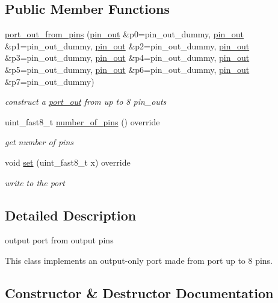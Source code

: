 \subsection*{Public Member Functions}
\begin{DoxyCompactItemize}
\item 
\hyperlink{classhwlib_1_1port__out__from__pins_af72ebaf01a3b43493d0cd60da2f66420}{port\+\_\+out\+\_\+from\+\_\+pins} (\hyperlink{classhwlib_1_1pin__out}{pin\+\_\+out} \&p0=pin\+\_\+out\+\_\+dummy, \hyperlink{classhwlib_1_1pin__out}{pin\+\_\+out} \&p1=pin\+\_\+out\+\_\+dummy, \hyperlink{classhwlib_1_1pin__out}{pin\+\_\+out} \&p2=pin\+\_\+out\+\_\+dummy, \hyperlink{classhwlib_1_1pin__out}{pin\+\_\+out} \&p3=pin\+\_\+out\+\_\+dummy, \hyperlink{classhwlib_1_1pin__out}{pin\+\_\+out} \&p4=pin\+\_\+out\+\_\+dummy, \hyperlink{classhwlib_1_1pin__out}{pin\+\_\+out} \&p5=pin\+\_\+out\+\_\+dummy, \hyperlink{classhwlib_1_1pin__out}{pin\+\_\+out} \&p6=pin\+\_\+out\+\_\+dummy, \hyperlink{classhwlib_1_1pin__out}{pin\+\_\+out} \&p7=pin\+\_\+out\+\_\+dummy)
\begin{DoxyCompactList}\small\item\em construct a \hyperlink{classhwlib_1_1port__out}{port\+\_\+out} from up to 8 pin\+\_\+outs \end{DoxyCompactList}\item 
uint\+\_\+fast8\+\_\+t \hyperlink{classhwlib_1_1port__out__from__pins_afc18ca0fb161e581efcf88c65c0baebc}{number\+\_\+of\+\_\+pins} () override
\begin{DoxyCompactList}\small\item\em get number of pins \end{DoxyCompactList}\item 
void \hyperlink{classhwlib_1_1port__out__from__pins_aefa5fd9f8d8756fb7c07a89eff03caa4}{set} (uint\+\_\+fast8\+\_\+t x) override
\begin{DoxyCompactList}\small\item\em write to the port \end{DoxyCompactList}\end{DoxyCompactItemize}


\subsection{Detailed Description}
output port from output pins 

This class implements an output-\/only port made from port up to 8 pins. 

\subsection{Constructor \& Destructor Documentation}
